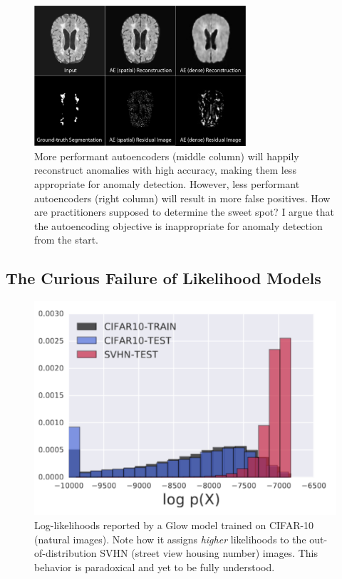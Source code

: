 \begin{figure}[tbhp]
\centering
    \centering
    \includegraphics[width=0.7\textwidth]{figures/ae_failure.jpg}
    \caption{More performant autoencoders (middle column) will happily reconstruct anomalies with high accuracy, making them less appropriate for anomaly detection. However, less performant autoencoders (right column) will result in more false positives. How are practitioners supposed to determine the sweet spot? I argue that the autoencoding objective is inappropriate for anomaly detection from the start.}
    \label{fig:ae_failure}
\end{figure}%


\subsection*{The Curious Failure of Likelihood Models}

\begin{figure}[tbhp]
    \centering
    \includegraphics[width=.6\textwidth]{figures/cifar_glow_nalisnick.png}
    \caption{Log-likelihoods reported by a Glow model trained on CIFAR-10 (natural images). Note how it assigns \textit{higher} likelihoods to the out-of-distribution SVHN (street view housing number) images. This behavior is paradoxical and yet to be fully understood.}
    \label{fig:cifar_glow}
\end{figure}

